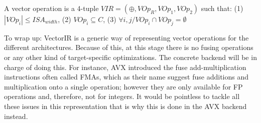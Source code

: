 \theoremstyle{definition}
\begin{definition}\label{def:VectorIR}
	A vector operation is a 4-tuple $VIR=(\oplus, VOp_{R}, VOp_{1}, 
	VOp_{2})$ such that: (1) $|VOp_{i}| \leq ISA_{width}$, (2) $VOp_{i} 
	\subseteq C$, (3) $\forall i,j / VOp_{i} \cap VOp_{j} = \emptyset$
\end{definition}

To wrap up: VectorIR is a generic way of representing vector operations for the 
different
architectures. Because of this, at this stage there is no fusing operations or
any other kind of target-specific optimizations. The concrete backend will be in
charge of doing this. For instance, AVX introduced the fuse add-multiplication
instructions often called FMAs, which as their name suggest fuse additions and
multiplication onto a single operation; however they are only available for FP
operations and, therefore, not for integers. It would be pointless to tackle
all these issues in this representation that is why this is done in the AVX
backend instead.


